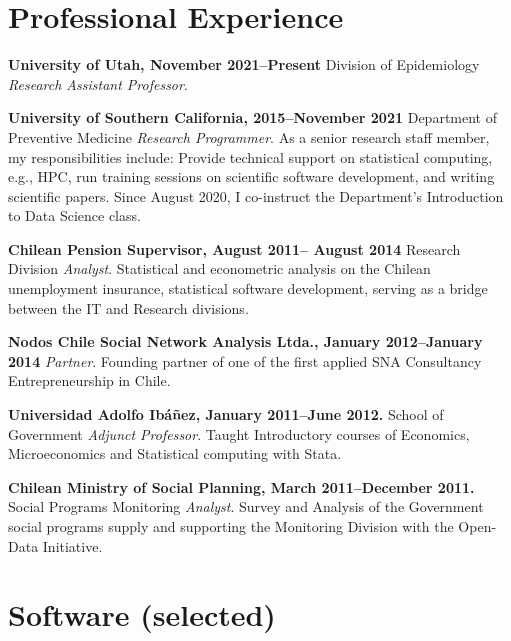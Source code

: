 \documentclass[letterpaper, 11pt]{article}
\renewenvironment{itemize}{
  \begin{list}{}{
    \setlength{\leftmargin}{0.45cm}
  }
}{
  \end{list}
}
\renewcommand{\textbf}[1]{{\bfseries\color{teal}#1}}
\begin{document}
\section*{Professional Experience}

\begin{itemize}
\item \textbf{University of Utah, November 2021--Present} Division of Epidemiology \emph{Research Assistant Professor}.
\item \textbf{University of Southern California, 2015--November 2021} Department of Preventive Medicine \emph{Research Programmer}. As a senior research staff member, my responsibilities include: Provide technical support on statistical computing, e.g., HPC, run training sessions on scientific software development, and writing scientific papers. Since August 2020, I co-instruct the Department's Introduction to Data Science class.
\item \textbf{Chilean Pension Supervisor, August 2011-- August 2014} Research Division \emph{Analyst}. Statistical and econometric analysis on the Chilean unemployment insurance, statistical software development, serving as a bridge between the IT and Research divisions.
\item \textbf{Nodos Chile Social Network Analysis Ltda., January 2012--January 2014} \emph{Partner}.
Founding partner of one of the first applied SNA Consultancy Entrepreneurship in Chile.
\item \textbf{Universidad Adolfo Ib\'a\~nez, January 2011--June 2012.} School of Government \emph{Adjunct Professor}.
Taught Introductory courses of Economics, Microeconomics and Statistical computing with Stata.
\item \textbf{Chilean Ministry of Social Planning, March 2011--December 2011.} Social Programs Monitoring \emph{Analyst}.
Survey and Analysis of the Government social programs supply and supporting the Monitoring Division with the Open-Data Initiative.
\end{itemize}

\section*{Software {\small (selected)}}
\end{document}
